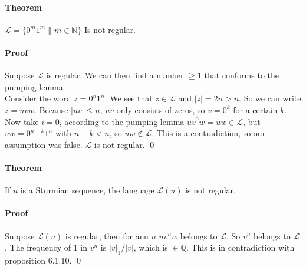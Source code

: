 \documentclass{article}
\begin{document}
\paragraph{Theorem}
$\mathcal{L} = \{0^m1^m\|m \in \mathbb{N}\}$ Is not regular.

\paragraph{Proof}
Suppose $\mathcal{L}$ is regular. We can then find a number $\ge 1$ that 
conforms to the pumping lemma.\\
Consider the word $z = 0^n1^n$. We see that $z \in \mathcal{L}$ and 
$|z| = 2n > n$. So we can write $z = uvw$. Because $|uv| \le n$, $uv$ only
consists of zeros, so $v = 0^k$ for a certain $k$. Now take $i = 0$, according
to the pumping lemma $uv^0w = uw \in \mathcal{L}$, but $uw = 0^{n - k}1^n$ 
with $n - k < n$, so $uw \notin \mathcal{L}$. This is a contradiction, so our
assumption was false. $\mathcal{L}$ is not regular. \qed

\paragraph{Theorem}
If $u$ is a Sturmian sequence, the language $\mathcal{L}(u)$ is not regular.

\paragraph{Proof}
Suppose $\mathcal{L}(u)$ is regular, then for anu $n$ $uv^nw$ belongs to 
$\mathcal{L}$. So $v^n$ belongs to $\mathcal{L}$. The frequency of 1 in $v^n$ 
is $|v|_1 / |v|$, which is $\in \mathbb{Q}$. This is in contradiction with 
proposition 6.1.10. \qed
\end{document}
